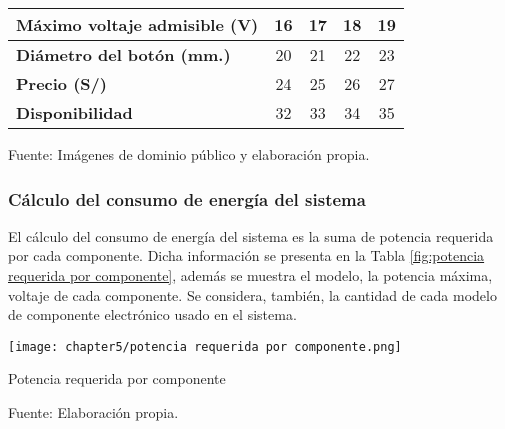 \begin{mytable}[H]
\begin{tabular}{l|c|c|c|c|}
	\multicolumn{1}{|l|}{
		\begin{minipage}{\myforthmaxsizeofcontenttable}			
			\textbf{Máximo voltaje admisible (V)}
		\end{minipage}
	}
	&
	16
	& 17         & 18         & 19         \\ \hline
	\multicolumn{1}{|l|}{
			\begin{minipage}{\myforthmaxsizeofcontenttable}			
				\textbf{Diámetro del botón (mm.)}
			\end{minipage}
	} & 20                                                                    & 21         & 22         & 23         \\ \hline
	\multicolumn{1}{|l|}{\textbf{Precio (S/)}}              & 24                                                                    & 25         & 26         & 27         \\ \hline
	\multicolumn{1}{|l|}{\textbf{Disponibilidad}}           & 32                                                                    & 33         & 34         & 35         \\ \hline
\end{tabular}
\begin{flushleft}	
	Fuente: Imágenes de dominio público y elaboración propia.
\end{flushleft}
\end{mytable}

\subsubsection{Cálculo del consumo de energía del sistema} 

El cálculo del consumo de energía del sistema es la suma de potencia requerida por cada componente. Dicha información se presenta en la Tabla \ref{fig:potencia requerida por componente}, además se muestra el modelo, la potencia máxima, voltaje de cada componente. Se considera, también, la cantidad de cada modelo de componente electrónico usado en el sistema.

     
\begin{myfigure}[H]
	\centering
	\texttt{[image: chapter5/potencia requerida por componente.png]}
	\caption{Potencia requerida por componente}
	\begin{myflushleftportland}
		Fuente: Elaboración propia.
	\end{myflushleftportland}
	\label{fig:potencia requerida por componente}
\end{myfigure}


